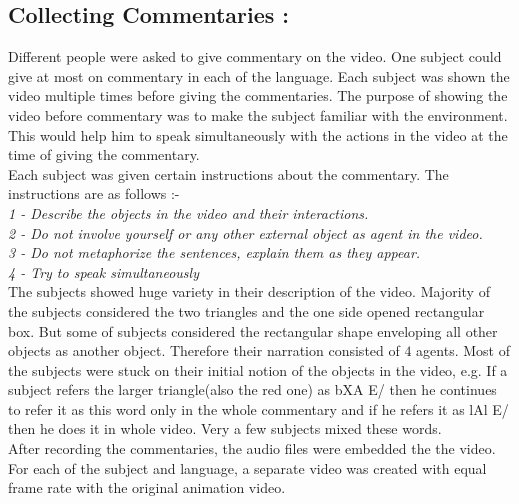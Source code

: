 \def\DevnagVersion{2.15}\documentclass[a4paper, 11pt, notitlepage]{report}
\begin{document}
\subsection{Collecting Commentaries :} Different people were asked to give commentary on the video. One subject could give at most on commentary in each of the language. Each subject was shown the video multiple times before giving the commentaries. The purpose of showing the video before commentary was to make the subject familiar with the environment. This would help him to speak simultaneously with the actions in the video at the time of giving the commentary.\\
\hspace*{10pt} Each subject was given certain instructions about the commentary. The instructions are as follows :-\\
{\it 
\hspace*{10pt} 1 - Describe the objects in the video and their interactions.\\
\hspace*{10pt} 2 - Do not involve yourself or any other external object as agent in the video.\\ 
\hspace*{10pt} 3 - Do not metaphorize the sentences, explain them as they appear. \\
\hspace*{10pt} 4 - Try to speak simultaneously \\
}
The subjects showed huge variety in their description of the video. Majority of the subjects considered the two triangles and the one side opened rectangular box. But some of subjects considered the rectangular shape enveloping all other objects as another object. Therefore their narration consisted of $4$ agents. Most of the subjects were stuck on their initial notion of the objects in the video, e.g. If a subject refers the larger triangle(also the red one) as {\dn bXA E/} then he continues to refer it as this word only in the whole commentary and if he refers it as {\dn lAl E/} then he does it in whole video. Very a few subjects mixed these words.  \\
After recording the commentaries, the audio files were embedded the the video. For each of the subject and language, a separate video was created with equal frame rate with the original animation video.\\
\end{document}
